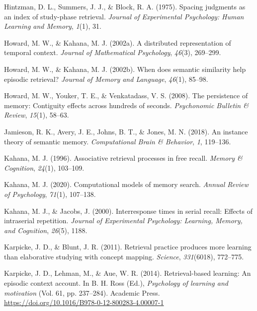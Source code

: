 \documentclass[
  man,
  floatsintext,
  longtable,
  nolmodern,
  notxfonts,
  notimes,
  draftfirst,
  colorlinks=true,linkcolor=blue,citecolor=blue,urlcolor=blue]{apa7}
\newlength{\cslhangindent}
\newenvironment{CSLReferences}[2] %
 {\begin{list}{}{%
  \setlength{\itemindent}{0pt}
  \setlength{\leftmargin}{0pt}
  \setlength{\parsep}{0pt}
  \ifodd #1
   \setlength{\leftmargin}{\cslhangindent}
   \setlength{\itemindent}{-1\cslhangindent}
  \fi
  \setlength{\itemsep}{#2\baselineskip}}}
 {\end{list}}
\begin{document}
\begin{CSLReferences}{1}{0}
Hintzman, D. L., Summers, J. J., \& Block, R. A. (1975). Spacing
judgments as an index of study-phase retrieval. \emph{Journal of
Experimental Psychology: Human Learning and Memory}, \emph{1}(1), 31.

Howard, M. W., \& Kahana, M. J. (2002a). A distributed representation of
temporal context. \emph{Journal of Mathematical Psychology},
\emph{46}(3), 269--299.

Howard, M. W., \& Kahana, M. J. (2002b). When does semantic similarity
help episodic retrieval? \emph{Journal of Memory and Language},
\emph{46}(1), 85--98.

Howard, M. W., Youker, T. E., \& Venkatadass, V. S. (2008). The
persistence of memory: Contiguity effects across hundreds of seconds.
\emph{Psychonomic Bulletin \& Review}, \emph{15}(1), 58--63.

Jamieson, R. K., Avery, J. E., Johns, B. T., \& Jones, M. N. (2018). An
instance theory of semantic memory. \emph{Computational Brain \&
Behavior}, \emph{1}, 119--136.

Kahana, M. J. (1996). Associative retrieval processes in free recall.
\emph{Memory \& Cognition}, \emph{24}(1), 103--109.

Kahana, M. J. (2020). Computational models of memory search.
\emph{Annual Review of Psychology}, \emph{71}(1), 107--138.

Kahana, M. J., \& Jacobs, J. (2000). Interresponse times in serial
recall: Effects of intraserial repetition. \emph{Journal of Experimental
Psychology: Learning, Memory, and Cognition}, \emph{26}(5), 1188.

Karpicke, J. D., \& Blunt, J. R. (2011). Retrieval practice produces
more learning than elaborative studying with concept mapping.
\emph{Science}, \emph{331}(6018), 772--775.

Karpicke, J. D., Lehman, M., \& Aue, W. R. (2014). Retrieval-based
learning: An episodic context account. In B. H. Ross (Ed.),
\emph{Psychology of learning and motivation} (Vol. 61, pp. 237--284).
Academic Press. \url{https://doi.org/10.1016/B978-0-12-800283-4.00007-1}


\end{CSLReferences}
\end{document}

